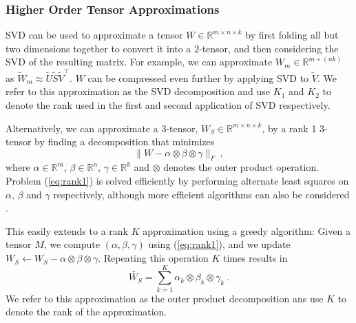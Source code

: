 \subsubsection{Higher Order Tensor Approximations}\label{subsubsec:svd_tensor}
SVD can be used to approximate a tensor $W \in \mathbb{R}^{m \times n \times k}$
by first folding all but two dimensions together to convert it into a $2$-tensor, %
and then considering the SVD of the resulting matrix. For example, we can approximate $W_m \in \mathbb{R}^{m \times (nk)}$ as $\tilde{W}_m \approx \tilde{U}\tilde{S}\tilde{V}^{\top}$. 
$W$ can be compressed even further by applying SVD to $\tilde{V}$. We refer to this approximation as the SVD decomposition and use $K_1$ and $K_2$ to denote the rank used in the first and second application of SVD respectively.

Alternatively, we can approximate a 3-tensor, $W_S \in \mathbb{R}^{m \times n \times k}$, by a rank 1 3-tensor by finding a decomposition that minimizes 
\begin{equation}
\label{eq:rank1}
	\| W - \alpha \otimes \beta \otimes \gamma \|_F~,
\end{equation} 
where $\alpha \in \mathbb{R}^m$, $\beta \in \mathbb{R}^{n}$, $\gamma \in \mathbb{R}^k$ and $\otimes$ denotes the outer product operation.
Problem (\ref{eq:rank1}) is solved efficiently by performing alternate least squares 
on $\alpha$, $\beta$ and $\gamma$ respectively, although more efficient algorithms can also be 
considered \cite{rankonetensors}. 

This easily extends to a rank $K$ approximation using a greedy algorithm: Given a 
tensor $M$, we compute $(\alpha, \beta, \gamma)$ using (\ref{eq:rank1}), and we update 
$W_S \leftarrow W_S - \alpha \otimes \beta \otimes \gamma$. Repeating this operation $K$
times results in 
\begin{equation}
\label{eq:rankK}
	\tilde{W_S} = \sum_{k = 1}^{K} \alpha_k \otimes \beta_k \otimes \gamma_k ~.
\end{equation} 
We refer to this approximation as the outer product decomposition ans use $K$ to denote the rank of the approximation.

\vspace{-3mm}

